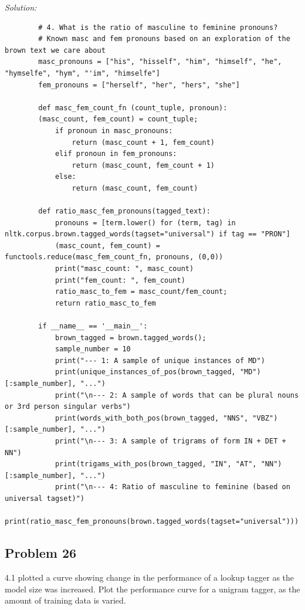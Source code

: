 \documentclass[11pt]{article}
\newenvironment{solution}{
	\vspace{10px}\noindent\emph{Solution:}
}{
	\vspace{10px}
}
\begin{document}
\begin{solution}
\begin{lstlisting}
		# 4. What is the ratio of masculine to feminine pronouns?
		# Known masc and fem pronouns based on an exploration of the brown text we care about
		masc_pronouns = ["his", "hisself", "him", "himself", "he", "hymselfe", "hym", "'im", "himselfe"]
		fem_pronouns = ["herself", "her", "hers", "she"]
		
		def masc_fem_count_fn (count_tuple, pronoun): 
		(masc_count, fem_count) = count_tuple;
			if pronoun in masc_pronouns:
				return (masc_count + 1, fem_count)
			elif pronoun in fem_pronouns:
				return (masc_count, fem_count + 1)
			else: 
				return (masc_count, fem_count) 
		
		def ratio_masc_fem_pronouns(tagged_text):
			pronouns = [term.lower() for (term, tag) in nltk.corpus.brown.tagged_words(tagset="universal") if tag == "PRON"]
			(masc_count, fem_count) = functools.reduce(masc_fem_count_fn, pronouns, (0,0))
			print("masc_count: ", masc_count)
			print("fem_count: ", fem_count)
			ratio_masc_to_fem = masc_count/fem_count; 
			return ratio_masc_to_fem
		
		if __name__ == '__main__':
			brown_tagged = brown.tagged_words();
			sample_number = 10
			print("--- 1: A sample of unique instances of MD")
			print(unique_instances_of_pos(brown_tagged, "MD")[:sample_number], "...")
			print("\n--- 2: A sample of words that can be plural nouns or 3rd person singular verbs")
			print(words_with_both_pos(brown_tagged, "NNS", "VBZ")[:sample_number], "...")
			print("\n--- 3: A sample of trigrams of form IN + DET + NN")
			print(trigams_with_pos(brown_tagged, "IN", "AT", "NN")[:sample_number], "...")
			print("\n--- 4: Ratio of masculine to feminine (based on universal tagset)")
			print(ratio_masc_fem_pronouns(brown.tagged_words(tagset="universal")))
	\end{lstlisting}
	
\end{solution} 


\newpage
\subsection*{Problem 26}

 4.1 plotted a curve showing change in the performance of a lookup tagger as the model size was increased. Plot the performance curve for a unigram tagger, as the amount of training data is varied.
\end{document}
